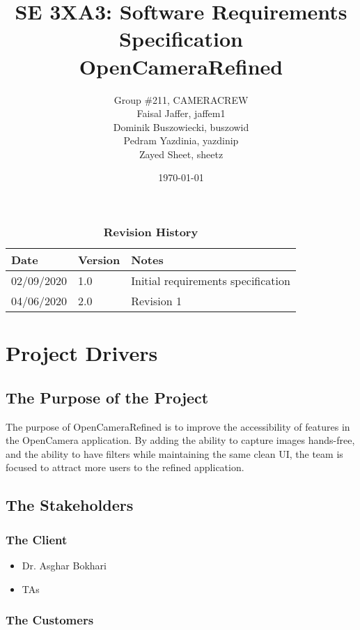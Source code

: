 \documentclass[12pt, titlepage]{article}
\title{SE 3XA3: Software Requirements Specification\\OpenCameraRefined}
\author{Group \#211, CAMERACREW
		\\ Faisal Jaffer, jaffem1
		\\ Dominik Buszowiecki, buszowid
		\\ Pedram Yazdinia, yazdinip
		\\ Zayed Sheet, sheetz
}
\date{\today}
\begin{document}
\maketitle

\tableofcontents
\listoftables
\listoffigures

\begin{table}[bp]
\caption{\bf Revision History}
\begin{tabularx}{\textwidth}{p{3cm}p{2cm}X}
\toprule {\bf Date} & {\bf Version} & {\bf Notes}\\
\midrule
02/09/2020 & 1.0 & Initial requirements specification\\
04/06/2020 & 2.0 & Revision 1\\ 
\bottomrule
\end{tabularx}
\end{table}

\newpage


\section{Project Drivers}

\subsection{The Purpose of the Project}

The purpose of OpenCameraRefined is to improve the accessibility of features in the OpenCamera application. By adding the ability to capture images hands-free, and the ability to have filters while maintaining the same clean UI, the team is focused to attract more users to the refined application. 

\subsection{The Stakeholders}

\subsubsection{The Client}

\begin{itemize}
\item Dr. Asghar Bokhari
\item TAs
\end{itemize}

\subsubsection{The Customers}
\end{document}

